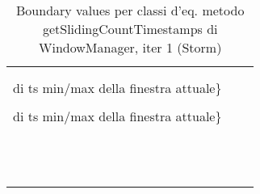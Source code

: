 \documentclass[10pt, a4paper]{article}
\newcommand{\Intmaketable}[4]{
	\begin{longtable}{#3}
	#4
	\caption{#2}
	\label{#1}
	\end{longtable}
}
\newcommand{\Intbvtable}[3]{
	\Intmaketable{#1}{#2}{|l|l|l|}{
	\hline
	\thead{Parametro formale} & \thead{Classe d'equivalenza} & \thead{Boundary value}\\
	\hline
	\hline
	#3
	\hline}
}
\newcommand{\Intbvcaption}[4]{Boundary values per classi d'eq. metodo #1 di #2, iter #3 (#4)}
\newcommand{\gettablelabel}[5]{table:#1:#2:#3:iter#4:proj#5}
\newcommand{\bvtable}[5]{
	\Intbvtable{\gettablelabel{bv}{#1}{#2}{#3}{#4}}
		{\Intbvcaption{#1}{#2}{#3}{#4}}
		{#5}
}
\newcommand{\tcell}{\makecell[tl]}
\newcommand{\newtrow}{\\ \hline}
\def\storm{Storm}
\newcommand{\ceq}[1]{\{#1\}}
\begin{document}
	\bvtable{getSlidingCountTimestamps}{WindowManager}{1}{\storm}{
			\tcell{startTs} &
			\tcell{\ceq{$< 0$}} &
			\tcell{$-1$}
		\newtrow
			\tcell{startTs} &
			\tcell{\ceq{timestamp $\ge 0$ che non è nel range\\ di ts min/max della finestra attuale}} &
			\tcell{$0$}
		\newtrow
			\tcell{startTs} &
			\tcell{\ceq{timestamp $\ge 0$ di evento che è nel range\\ di ts min/max della finestra attuale}} &
			\tcell{$t(e_1)$}
		\newtrow
			\tcell{endTs} &
			\tcell{\ceq{=startTs}} &
			\tcell{$-1$}
		\newtrow
			\tcell{endTs} &
			\tcell{\ceq{=startTs}} &
			\tcell{$0$}
		\newtrow
			\tcell{endTs} &
			\tcell{\ceq{=startTs}} &
			\tcell{$t(e_1)$}
		\newtrow
			\tcell{endTs} &
			\tcell{\ceq{>startTs}} &
			\tcell{$0$}
		\newtrow
			\tcell{endTs} &
			\tcell{\ceq{>startTs}} &
			\tcell{$1$}
		\newtrow
			\tcell{endTs} &
			\tcell{\ceq{>startTs}} &
			\tcell{$t(e_1)+1$}
		\newtrow
			\tcell{endTs} &
			\tcell{\ceq{<startTs}} &
			\tcell{$-2$}
		\newtrow
			\tcell{endTs} &
			\tcell{\ceq{<startTs}} &
			\tcell{$-1$}
		\newtrow
			\tcell{endTs} &
			\tcell{\ceq{<startTs}} &
			\tcell{$t(e_1)-1$}
		\newtrow
			\tcell{slidingCount} &
			\tcell{\ceq{$\le 0$}} &
			\tcell{$0$}
		\newtrow
			\tcell{slidingCount} &
			\tcell{\ceq{$\ge 1$}} &
			\tcell{$1$}
		\newtrow
	}
	
\end{document}
